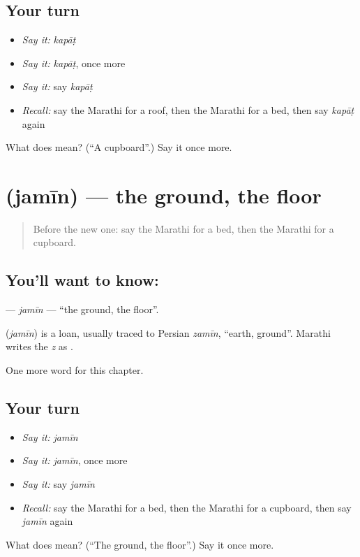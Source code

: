 \subsection*{Your turn}
\begin{itemize}
\raggedright
  \item \emph{Say it:} \emph{kapāṭ}
  \item \emph{Say it:} \emph{kapāṭ}, once more
  \item \emph{Say it:} say \emph{kapāṭ}
  \item \emph{Recall:} say the Marathi for a roof, then the Marathi for a bed, then say \emph{kapāṭ} again
\end{itemize}

\begin{tcolorbox}[breakable,colback=teal!4,colframe=teal!35!black,title={Before you move on}]
What does  mean? (\textquotedblleft{}A cupboard\textquotedblright{}.) Say it once more.
\end{tcolorbox}
\section[\texorpdfstring{\mr{जमीन} (jamīn)}{जमीन (jamīn)}]{ (jamīn) — the ground, the floor}

\label{lesson:MR-C90-jamin}



\begin{quote}
Before the new one: say the Marathi for a bed, then the Marathi for a cupboard.
\end{quote}

\subsection*{You'll want to know: }
\textbf{} — \emph{jamīn} — \textquotedblleft{}the ground, the floor\textquotedblright{}.

\begin{cousinweb}
\textbf{} (\emph{jamīn}) is a loan, usually traced to Persian \emph{zamīn}, \textquotedblleft{}earth, ground\textquotedblright{}. Marathi writes the \emph{z} as \textbf{}.
\end{cousinweb}

\begin{grammarlens}[title={What you've built}]
One more word for this chapter.
\end{grammarlens}

\subsection*{Your turn}
\begin{itemize}
\raggedright
  \item \emph{Say it:} \emph{jamīn}
  \item \emph{Say it:} \emph{jamīn}, once more
  \item \emph{Say it:} say \emph{jamīn}
  \item \emph{Recall:} say the Marathi for a bed, then the Marathi for a cupboard, then say \emph{jamīn} again
\end{itemize}

\begin{tcolorbox}[breakable,colback=teal!4,colframe=teal!35!black,title={Before you move on}]
What does  mean? (\textquotedblleft{}The ground, the floor\textquotedblright{}.) Say it once more.
\end{tcolorbox}
